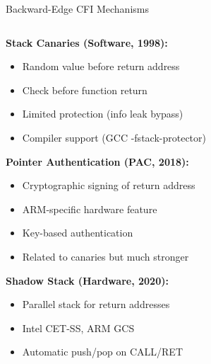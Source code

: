 \documentclass[aspectratio=169,12pt]{beamer}
\begin{document}
\begin{frame}{Backward-Edge CFI Mechanisms}
    \begin{columns}
        \begin{column}{0.5\textwidth}
            \textbf{Stack Canaries (Software, 1998):}
            \begin{itemize}
                \item Random value before return address
                \item Check before function return
                \item Limited protection (info leak bypass)
                \item Compiler support (GCC -fstack-protector)
            \end{itemize}
            
            \vspace{0.3cm}
            \textbf{Pointer Authentication (PAC, 2018):}
            \begin{itemize}
                \item Cryptographic signing of return address
                \item ARM-specific hardware feature
                \item Key-based authentication
                \item Related to canaries but much stronger
            \end{itemize}
            
            \vspace{0.3cm}
            \textbf{Shadow Stack (Hardware, 2020):}
            \begin{itemize}
                \item Parallel stack for return addresses
                \item Intel CET-SS, ARM GCS
                \item Automatic push/pop on CALL/RET
            \end{itemize}
        \end{column}
        \begin{column}{0.5\textwidth}
\end{column}
\end{columns}
\end{frame}
\end{document}
